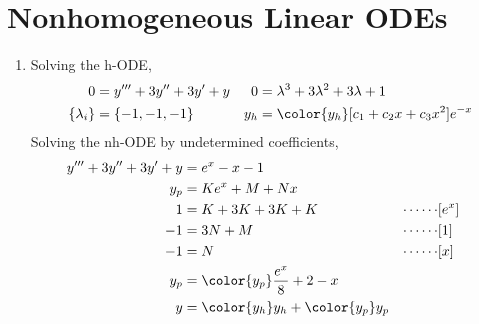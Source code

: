 \section{Nonhomogeneous Linear ODEs}

\begin{enumerate}
    \item Solving the h-ODE,
          \begin{align}
              0               & = y''' + 3y'' + 3y' + y                           &
              0               & = \lambda^{3} + 3\lambda^{2} + 3\lambda + 1         \\
              \{\lambda_{i}\} & = \{-1, -1, -1\}                                  &
              y_{h}           & = \color{y_h} [c_{1} + c_{2}x + c_{3}x^{2}]e^{-x}
          \end{align}
          Solving the nh-ODE by undetermined coefficients,
          \begin{align}
              y''' + 3y'' + 3y' + y & = e^{x} - x - 1                               \\
              y_{p}                 & = Ke^{x} + M + Nx                             \\
              1                     & = K + 3K + 3K + K                           &
              \cdots\cdots          & [e^{x}]                                       \\
              -1                    & = 3N + M                                    &
              \cdots\cdots          & [1]                                           \\
              -1                    & = N                                         &
              \cdots\cdots          & [x]                                           \\
              y_{p}                 & = \color{y_p} \frac{e^{x}}{8} + 2 - x         \\
              y                     & = {\color{y_h} y_{h}} + {\color{y_p} y_{p}}
          \end{align}


\end{enumerate}
